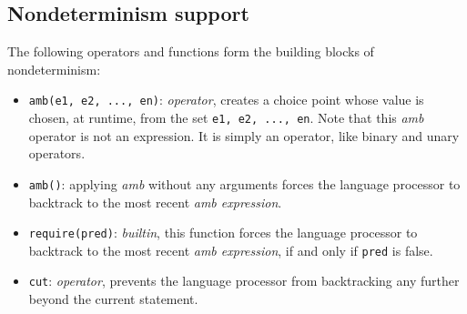 \subsection*{Nondeterminism support}

The following operators and functions form the building blocks of nondeterminism:

\begin{itemize}
\item \lstinline{amb(e1, e2, ..., en)}: \textit{operator}, creates a choice point whose value is chosen, at runtime,
from the set \lstinline{e1, e2, ..., en}. Note that this \textit{amb} operator is not an expression. It is simply an operator, like binary and unary operators.
\item \lstinline{amb()}: applying \textit{amb} without any arguments forces the language processor to backtrack to the most recent \textit{amb expression}.
\item \lstinline{require(pred)}: \textit{builtin}, this function forces the language processor to backtrack to the most recent \textit{amb expression}, if and only if \lstinline{pred} is false.
\item \lstinline{cut}: \textit{operator}, prevents the language processor from backtracking any further beyond the current statement.
\end{itemize}
